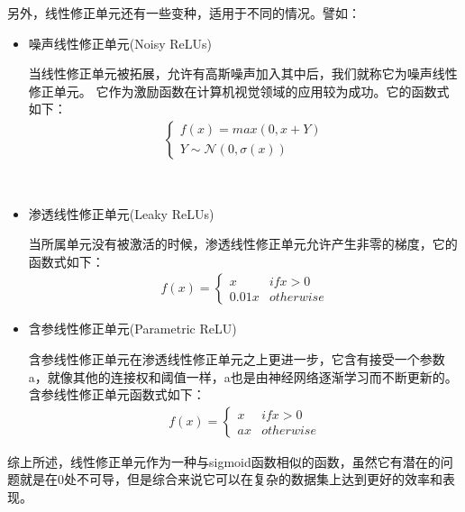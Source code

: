 		另外，线性修正单元还有一些变种，适用于不同的情况。譬如：
		\begin{itemize}
			\item{
				噪声线性修正单元(Noisy ReLUs)
				
				当线性修正单元被拓展，允许有高斯噪声加入其中后，我们就称它为噪声线性修正单元。 它作为激励函数在计算机视觉领域的应用较为成功。它的函数式如下：
				\begin{align}
				\begin{cases}
					f(x) = max(0, x + Y)\\
					Y \sim \mathcal{N}(0, \sigma (x))
				\end{cases}
				\end{align}
			}
			\\
			\item{
				渗透线性修正单元(Leaky ReLUs)
				
				当所属单元没有被激活的时候，渗透线性修正单元允许产生非零的梯度，它的函数式如下：
				\begin{align}
				f(x) = 
				\begin{cases}
					x & if x > 0 \\
					0.01x & otherwise
				\end{cases}
				\end{align}			
			}
			\item{
				含参线性修正单元(Parametric ReLU)
				
				含参线性修正单元在渗透线性修正单元之上更进一步，它含有接受一个参数a，就像其他的连接权和阈值一样，a也是由神经网络逐渐学习而不断更新的。含参线性修正单元函数式如下：
				\begin{align}
				f(x) = 
				\begin{cases}
					x & if x > 0 \\
					ax & otherwise
				\end{cases}
				\end{align}
			}
		\end{itemize}
		
		
		
		综上所述，线性修正单元作为一种与sigmoid函数相似的函数，虽然它有潜在的问题就是在0处不可导，但是综合来说它可以在复杂的数据集上达到更好的效率和表现。
		